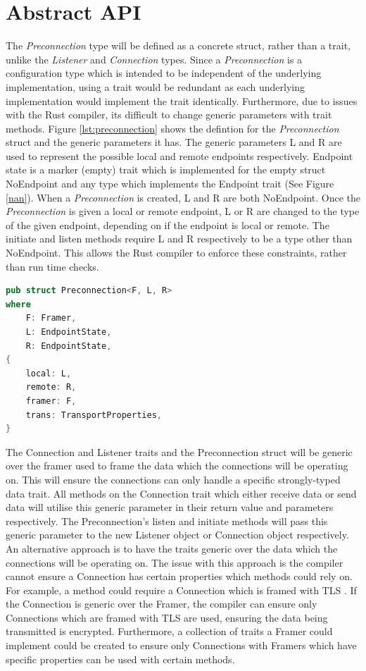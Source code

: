\documentclass{l4proj}
\begin{document}
\section{Abstract API}
The \emph{Preconnection} type will be defined as a concrete struct, rather than a trait, unlike the \emph{Listener} and
\emph{Connection} types.
Since a \emph{Preconnection} is a configuration type which is intended to be independent of the underlying
implementation, using a trait would be redundant as each underlying implementation would implement the trait identically.
Furthermore, due to issues with the Rust compiler, its difficult to change generic parameters with trait methods.
Figure \ref{lst:preconnection} shows the defintion for the \emph{Preconnection} struct and the generic parameters it has.
The generic parameters L and R are used to represent the possible local and remote endpoints respectively.
Endpoint state is a marker (empty) trait which is implemented for the empty struct NoEndpoint and any type which
implements the Endpoint trait (See Figure \ref{nan}).
When a \emph{Preconnection} is created, L and R are both NoEndpoint.
Once the \emph{Preconnection} is given a local or remote endpoint, L or R are changed to the type of the given endpoint,
depending on if the endpoint is local or remote.
The initiate and listen methods require L and R respectively to be a type other than NoEndpoint.
This allows the Rust compiler to enforce these constraints, rather than run time checks.

\begin{lstlisting}[language=Rust, float=h, label=lst:preconnection, caption={The Preconnection struct, showing the three
    generic parameters.}]
pub struct Preconnection<F, L, R>
where
    F: Framer,
    L: EndpointState,
    R: EndpointState,
{
    local: L,
    remote: R,
    framer: F,
    trans: TransportProperties,
}
\end{lstlisting}


The Connection and Listener traits and the Preconnection struct will be generic over the framer used to frame the data
which the connections will be operating on.
This will ensure the connections can only handle a specific strongly-typed data trait.
All methods on the Connection trait which either receive data or send data will utilise this generic parameter in their
return value and parameters respectively.
The Preconnection's listen and initiate methods will pass this generic parameter to the new Listener object or
Connection object respectively.
An alternative approach is to have the traits generic over the data which the connections will be operating on.
The issue with this approach is the compiler cannot ensure a Connection has certain properties which methods could rely
on.
For example, a method could require a Connection which is framed with TLS .
If the Connection is generic over the Framer, the compiler can ensure only Connections which are framed with TLS are
used, ensuring the data being transmitted is encrypted.
Furthermore, a collection of traits a Framer could implement could be created to ensure only Connections with Framers
which have specific properties can be used with certain methods.
\end{document}
